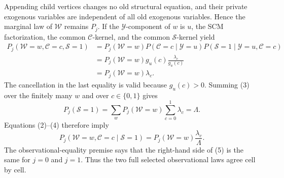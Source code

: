 Appending child vertices changes no old structural equation, and their private exogenous variables are independent of all old exogenous variables. Hence the marginal law of \(\mathcal W\) remains \(P_j\). If the \(\mathcal Y\)-component of \(w\) is \(u\), the SCM factorization, the common \(\mathcal C\)-kernel, and the common \(\mathcal S\)-kernel yield
\[
\begin{aligned}
 P_j(\mathcal W=w,\mathcal C=c,\mathcal S=1)
 &=P_j(\mathcal W=w)
   P(\mathcal C=c\mid\mathcal Y=u)
   P(\mathcal S=1\mid\mathcal Y=u,\mathcal C=c)\\
 &=P_j(\mathcal W=w)g_u(c)\frac{\lambda_c}{g_u(c)}\\
 &=P_j(\mathcal W=w)\lambda_c.                           \tag{3}
\end{aligned}
\]
The cancellation in the last equality is valid because \(g_u(c)>0\). Summing (3) over the finitely many \(w\) and over \(c\in\{0,1\}\) gives
\[
 P_j(\mathcal S=1)=\sum_wP_j(\mathcal W=w)
                    \sum_{c=0}^1\lambda_c
                  =\Lambda.                              \tag{4}
\]
Equations (2)--(4) therefore imply
\[
 P_j(\mathcal W=w,\mathcal C=c\mid\mathcal S=1)
 =P_j(\mathcal W=w)\frac{\lambda_c}{\Lambda}.            \tag{5}
\]
The observational-equality premise says that the right-hand side of (5) is the same for \(j=0\) and \(j=1\). Thus the two full selected observational laws agree cell by cell.

